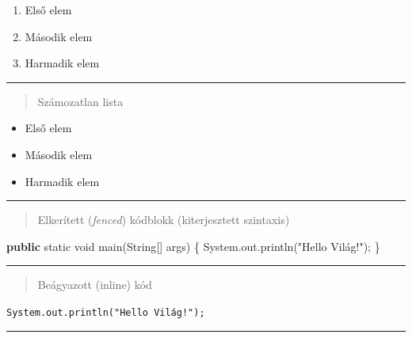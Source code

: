 \documentclass[
]{article}
\newenvironment{Shaded}{}{}
\newcommand{\BuiltInTok}[1]{\textcolor[rgb]{0.00,0.50,0.00}{#1}}
\newcommand{\DataTypeTok}[1]{\textcolor[rgb]{0.56,0.13,0.00}{#1}}
\newcommand{\FunctionTok}[1]{\textcolor[rgb]{0.02,0.16,0.49}{#1}}
\newcommand{\KeywordTok}[1]{\textcolor[rgb]{0.00,0.44,0.13}{\textbf{#1}}}
\newcommand{\NormalTok}[1]{#1}
\newcommand{\OperatorTok}[1]{\textcolor[rgb]{0.40,0.40,0.40}{#1}}
\newcommand{\StringTok}[1]{\textcolor[rgb]{0.25,0.44,0.63}{#1}}
\providecommand{\tightlist}{%
  \setlength{\itemsep}{0pt}\setlength{\parskip}{0pt}}
\begin{document}
\begin{enumerate}
\def\labelenumi{\arabic{enumi}.}
\tightlist
\item
  Első elem
\item
  Második elem
\item
  Harmadik elem
\end{enumerate}

\begin{center}\rule{0.5\linewidth}{0.5pt}\end{center}

\begin{quote}
Számozatlan lista
\end{quote}

\begin{itemize}
\tightlist
\item
  Első elem
\item
  Második elem
\item
  Harmadik elem
\end{itemize}

\begin{center}\rule{0.5\linewidth}{0.5pt}\end{center}

\begin{quote}
Elkerített (\emph{fenced}) kódblokk (kiterjesztett szintaxis)
\end{quote}

\begin{Shaded}
\begin{Highlighting}[]
\KeywordTok{public} \DataTypeTok{static} \DataTypeTok{void} \FunctionTok{main}\OperatorTok{(}\BuiltInTok{String}\OperatorTok{[]}\NormalTok{ args}\OperatorTok{)} \OperatorTok{\{}
    \BuiltInTok{System}\OperatorTok{.}\FunctionTok{out}\OperatorTok{.}\FunctionTok{println}\OperatorTok{(}\StringTok{"Hello Világ!"}\OperatorTok{);}
\OperatorTok{\}}
\end{Highlighting}
\end{Shaded}

\begin{center}\rule{0.5\linewidth}{0.5pt}\end{center}

\begin{quote}
Beágyazott (inline) kód
\end{quote}

\texttt{System.out.println("Hello\ Világ!");}

\begin{center}\rule{0.5\linewidth}{0.5pt}\end{center}
\end{document}
